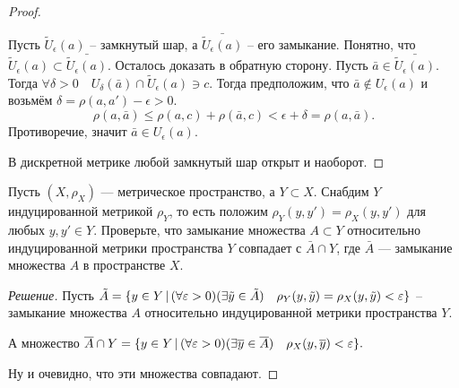\documentclass[10pt]{article}
\begin{document}
\begin{tasks}
\begin{proof}
\begin{conditions}
            \item Пусть $\tilde U_\epsilon(a)$ -- замкнутый шар, а $\bar{\tilde U_\epsilon(a)}$ -- его замыкание. Понятно, что $\tilde U_\epsilon(a) \subset \bar{\tilde U_\epsilon(a)}$. Осталось доказать в обратную сторону. Пусть $\bar a \in \bar{\tilde U_\epsilon(a)}$. Тогда $\forall \delta > 0 \quad U_\delta(\bar a) \cap \tilde U_\epsilon(a) \ni c$. Тогда предположим, что $\bar a \not\in U_\epsilon(a)$ и возьмём $\delta = \rho(a,a') - \epsilon > 0$.\[
            \rho(a, \bar a) \leqslant \rho(a, c) + \rho(\bar a, c) < \epsilon + \delta = \rho(a,\bar a).
            \]
            Противоречие, значит $\bar a \in U_\epsilon(a)$.
        \end{conditions}
        В дискретной метрике любой замкнутый шар открыт и наоборот.
    \end{proof}
    \item Пусть $(X,\rho_X)$ — метрическое пространство, а $Y\subset X$. Снабдим $Y$ индуцированной метрикой $\rho_Y$, то есть положим $\rho_Y(y,y')=\rho_X(y,y')$ для любых $y,y'\in Y$.  Проверьте, что замыкание множества $A\subset Y$ относительно индуцированной метрики пространства $Y$ совпадает с $\bar A \cap Y$, где $\bar A$ — замыкание множества $A$ в пространстве $X$.
    \begin{proof}
        [Решение]
        Пусть $\tilde A = \{y \in Y\,|\,  (\forall\varepsilon > 0)(\exists \tilde y\in \tilde A) \quad \rho_Y(y, \tilde y) = \rho_X(y, \tilde y) < \varepsilon\}$ -- замыкание множества $A$ относительно индуцированной метрики пространства $Y$.

        А множество $\overline A \cap Y = \{y \in Y\,|\, (\forall \varepsilon > 0)  (\exists\overline y \in \overline A) \quad \rho_X(y, \overline y) < \varepsilon\}.$

        Ну и очевидно, что эти множества совпадают.
    \end{proof}
\end{tasks}
    
\end{document}
